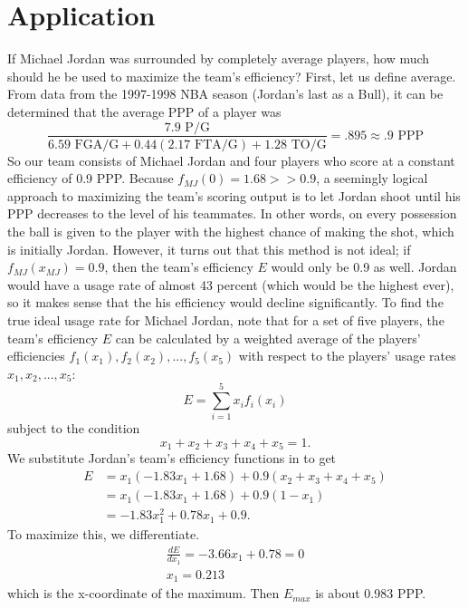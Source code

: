 \documentclass{article}
\begin{document}
\section*{Application}
If Michael Jordan was surrounded by completely average players, how much should he be used to maximize the team's efficiency? First, let us define average. From data from the 1997-1998 NBA season (Jordan's last as a Bull), it can be determined that the average PPP of a player was $$\frac{7.9\text{ P/G}}{6.59\text{ FGA/G}+0.44(2.17\text{ FTA/G})+1.28\text{ TO/G}} = .895 \approx .9 \text{ PPP}$$
So our team consists of Michael Jordan and four players who score at a constant efficiency of 0.9 PPP. Because $f_{MJ}(0) = 1.68 >> 0.9$, a seemingly logical approach to maximizing the team's scoring output is to let Jordan shoot until his PPP decreases to the level of his teammates. In other words, on every possession the ball is given to the player with the highest chance of making the shot, which is initially Jordan. However, it turns out that this method is not ideal; if $f_{MJ}(x_{MJ}) = 0.9$, then the team's efficiency $E$ would only be 0.9 as well. Jordan would have a usage rate of almost 43 percent (which would be the highest ever), so it makes sense that the his efficiency would decline significantly.
\newline To find the true ideal usage rate for Michael Jordan, note that for a set of five players, the team's efficiency $E$ can be calculated by a weighted average of the players' efficiencies $f_1(x_1), f_2(x_2),...,f_5(x_5)$ with respect to the players' usage rates $x_1, x_2,...,x_5$: $$E=\sum_{i=1}^{5}x_if_i(x_i)$$ subject to the condition $$x_1+x_2+x_3+x_4+x_5=1.$$
We substitute Jordan's team's efficiency functions in to get 
\begin{equation*} 
\begin{split}
E & = x_1(-1.83x_1+1.68)+0.9(x_2+x_3+x_4+x_5) \\
 & = x_1(-1.83x_1+1.68)+0.9(1-x_1) \\
 & = -1.83x_1^2+0.78x_1+0.9.
\end{split}
\end{equation*}
To maximize this, we differentiate.
\begin{gather*}
\frac{dE}{dx_1} = -3.66x_1+0.78  = 0 \\
 x_1 = 0.213
\end{gather*}
which is the x-coordinate of the maximum. Then $E_{max}$ is about 0.983 PPP. 
\end{document}
